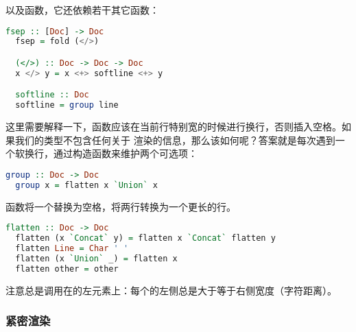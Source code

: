 \documentclass[./main.tex]{subfiles}
\begin{document}
以及函数，它还依赖若干其它函数：

\begin{lstlisting}[language=Haskell]
  fsep :: [Doc] -> Doc
  fsep = fold (</>)

  (</>) :: Doc -> Doc -> Doc
  x </> y = x <+> softline <+> y

  softline :: Doc
  softline = group line
\end{lstlisting}

这里需要解释一下，函数应该在当前行特别宽的时候进行换行，否则插入空格。如果我们的类型不包含任何关于
渲染的信息，那么该如何呢？答案就是每次遇到一个软换行，通过构造函数来维护两个可选项：

\begin{lstlisting}[language=Haskell]
  group :: Doc -> Doc
  group x = flatten x `Union` x
\end{lstlisting}

函数将一个替换为空格，将两行转换为一个更长的行。

\begin{lstlisting}[language=Haskell]
  flatten :: Doc -> Doc
  flatten (x `Concat` y) = flatten x `Concat` flatten y
  flatten Line = Char ' '
  flatten (x `Union` _) = flatten x
  flatten other = other
\end{lstlisting}

注意总是调用在的左元素上：每个的左侧总是大于等于右侧宽度（字符距离）。

\subsubsection*{紧密渲染}

\end{document}
